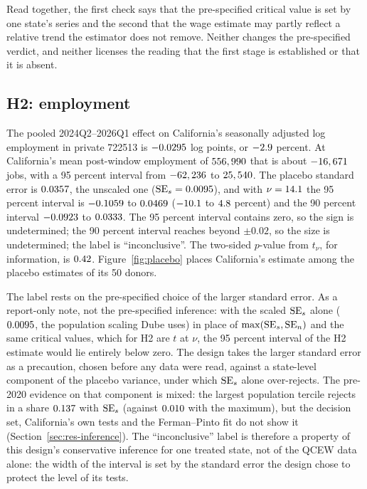 Read together, the first check says that the pre-specified critical value is set by one state's
series and the second that the wage estimate may partly reflect a relative trend the estimator
does not remove. Neither changes the pre-specified verdict, and neither licenses the reading that
the first stage is established or that it is absent.

\subsection{H2: employment}
\label{sec:res-h2}

The pooled 2024Q2--2026Q1 effect on California's seasonally adjusted log employment in private
722513 is $-0.0295$ log points, or $-2.9$ percent. At California's mean post-window employment
of $556,990$ that is about $-16,671$ jobs, with a 95 percent interval from $-62,236$ to
$25,540$. The placebo standard error is $0.0357$, the unscaled one ($\mathrm{SE}_{s} = 0.0095$),
and with $\nu = 14.1$ the 95 percent interval is $-0.1059$ to $0.0469$
($-10.1$ to $4.8$ percent) and the 90 percent interval $-0.0923$ to
$0.0333$. The 95 percent interval contains zero, so the sign is undetermined; the 90 percent
interval reaches beyond $\pm0.02$, so the size is undetermined; the label is ``inconclusive''. The
two-sided $p$-value from $t_\nu$, for information, is $0.42$. Figure~\ref{fig:placebo} places
California's estimate among the placebo estimates of its 50 donors.

The label rests on the pre-specified choice of the larger standard error. As a report-only note,
not the pre-specified inference: with the scaled $\mathrm{SE}_{s}$ alone ($0.0095$, the population
scaling Dube uses) in place of $\max(\mathrm{SE}_{s}, \mathrm{SE}_{n})$ and the same critical values, which for H2 are
$t$ at $\nu$, the 95 percent interval of the H2 estimate would lie entirely below zero. The design
takes the larger standard error as a precaution, chosen before any data were read, against a
state-level component of the placebo variance, under which $\mathrm{SE}_{s}$ alone over-rejects. The
pre-2020 evidence on that component is mixed: the largest population tercile rejects in a share
$0.137$ with $\mathrm{SE}_{s}$ (against $0.010$ with the maximum),
but the decision set, California's own tests and the Ferman--Pinto fit do not show it
(Section~\ref{sec:res-inference}). The
``inconclusive'' label is therefore a property of this design's conservative inference for one
treated state, not of the QCEW data alone: the width of the interval is set by the standard error
the design chose to protect the level of its tests.

